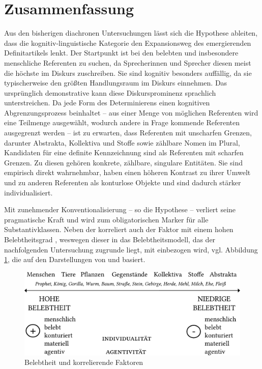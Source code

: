 \section{Zusammenfassung} \label{sec:bel-zusammenfassung}

Aus den bisherigen diachronen Untersuchungen lässt sich die Hypothese ableiten, dass die kognitiv-linguistische Kategorie  den Expansionsweg  des emergierenden Definitartikels  lenkt. Der Startpunkt ist bei den belebten  und insbesondere menschliche Referenten zu suchen, da Sprecherinnen und Sprecher diesen meist die höchste  im Diskurs zuschreiben.
Sie sind kognitiv besonders auffällig, da sie typischerweise den größten Handlungsraum im Diskurs einnehmen. Das ursprünglich demonstrative  kann diese Diskursprominenz sprachlich unterstreichen. Da jede Form des Determinierens einen kognitiven Abgrenzungsprozess beinhaltet -- aus einer Menge von möglichen Referenten wird eine Teilmenge ausgewählt, wodurch andere in Frage kommende Referenten ausgegrenzt werden -- ist zu erwarten, dass Referenten mit unscharfen Grenzen, darunter  Abstrakta, Kollektiva und Stoffe  sowie zählbare Nomen  im Plural,  Kandidaten für eine definite Kennzeichnung sind als Referenten mit scharfen Grenzen. Zu diesen gehören  konkrete, zählbare,  singulare Entitäten. Sie sind empirisch direkt wahrnehmbar, haben einen höheren Kontrast zu ihrer Umwelt und zu anderen Referenten als konturlose Objekte und sind dadurch stärker individualisiert. 

Mit zunehmender Konventionalisierung -- so die Hypothese -- verliert  seine pragmatische Kraft und wird zum obligatorischen Marker für alle  Substantivklassen. Neben der  korreliert auch der Faktor  mit einem hohen Belebtheitsgrad , weswegen dieser in das  Belebtheitsmodell, das der nachfolgenden Untersuchung zugrunde liegt, mit einbezogen wird, vgl. Abbildung \ref{abb:belebtheit-gesamt}, die auf den Darstellungen von \textcite[345]{Szczepaniak2011} und \textcite[98]{Nubling2012} basiert.  
    
\begin{figure}
\includegraphics[width=.75\textwidth]{images/Belebtheitsshierarchie.pdf}
\caption{Belebtheit und korrelierende Faktoren\label{abb:belebtheit-gesamt}}
\end{figure}



